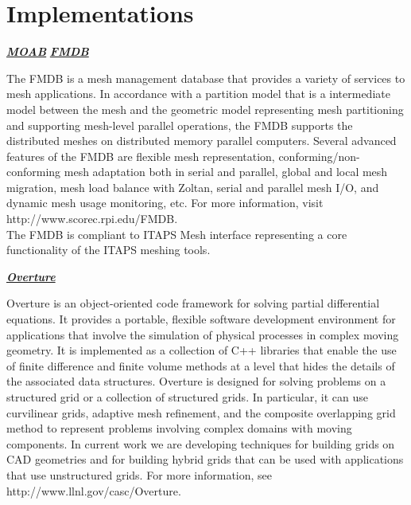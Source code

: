 \documentclass{article}
\begin{document}
\section{Implementations}

\textbf{\emph{{\underline {MOAB}}}}\newline \newline
\textbf{\emph{{\underline {FMDB}}}}

The FMDB is a mesh management database that provides a variety 
of services to mesh applications. In accordance with a partition 
model that is a intermediate model between the mesh and the geometric 
model representing mesh partitioning and supporting mesh-level 
parallel operations, the FMDB supports the distributed meshes 
on distributed memory parallel computers. Several advanced features 
of the FMDB are flexible mesh representation, conforming/non-conforming 
mesh adaptation both in serial and parallel, global and local 
mesh migration, mesh load balance with Zoltan, serial and parallel 
mesh I/O, and dynamic mesh usage monitoring, etc. For more information, 
visit http://www.scorec.rpi.edu/FMDB.\\ 

The FMDB is compliant to ITAPS Mesh interface representing a core 
functionality of the ITAPS meshing tools.\newline \newline


\textbf{\emph{{\underline {Overture}}}}

Overture is an object-oriented code framework for solving partial 
differential equations. It provides a portable, flexible software 
development environment for applications that involve the simulation 
of physical processes in complex moving geometry. It is implemented 
as a collection of C++ libraries that enable the use of finite 
difference and finite volume methods at a level that hides the 
details of the associated data structures. Overture is designed 
for solving problems on a structured grid or a collection of 
structured grids. In particular, it can use curvilinear grids, 
adaptive mesh refinement, and the composite overlapping grid 
method to represent problems involving complex domains with moving 
components. In current work we are developing techniques for 
building grids on CAD geometries and for building hybrid grids 
that can be used with applications that use unstructured grids. 
For more information, see http://www.llnl.gov/casc/Overture.\\
\end{document}
